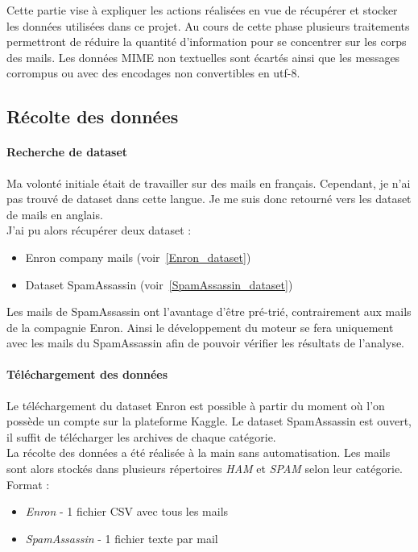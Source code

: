 Cette partie vise à expliquer les actions réalisées en vue de récupérer et stocker les données utilisées dans ce projet.
Au cours de cette phase plusieurs traitements permettront de réduire la quantité d'information pour se concentrer sur les corps des mails.
Les données MIME non textuelles sont écartés ainsi que les messages corrompus ou avec des encodages non convertibles en utf-8.

\subsection{Récolte des données}
	\paragraph{Recherche de dataset}
		Ma volonté initiale était de travailler sur des mails en français.
		Cependant, je n'ai pas trouvé de dataset dans cette langue.
		Je me suis donc retourné vers les dataset de mails en anglais. \\
		J'ai pu alors récupérer deux dataset :
			\begin{itemize}
				\item Enron company mails (voir~\ref{Enron_dataset})
				\item Dataset SpamAssassin (voir~\ref{SpamAssassin_dataset})
			\end{itemize}
			Les mails de SpamAssassin ont l'avantage d'être pré-trié, contrairement aux mails de la compagnie Enron.
			Ainsi le développement du moteur se fera uniquement avec les mails du SpamAssassin afin de pouvoir vérifier les résultats de l'analyse.

		\paragraph{Téléchargement des données}
			Le téléchargement du dataset Enron est possible à partir du moment où l'on possède un compte sur la plateforme Kaggle.
			Le dataset SpamAssassin est ouvert, il suffit de télécharger les archives de chaque catégorie. \\

			La récolte des données a été réalisée à la main sans automatisation.
			Les mails sont alors stockés dans plusieurs répertoires \emph{HAM} et \emph{SPAM} selon leur catégorie. \\

			Format :
			\begin{itemize}
				\item \emph{Enron} - 1 fichier CSV avec tous les mails
				\item \emph{SpamAssassin} - 1 fichier texte par mail
			\end{itemize}

